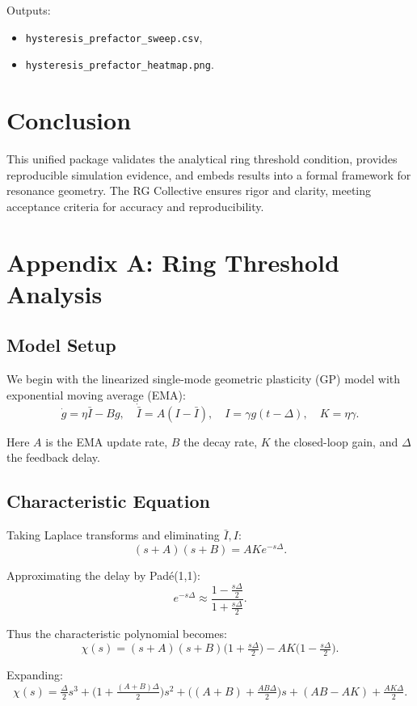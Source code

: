 \documentclass[12pt]{article}
\begin{document}
Outputs:
\begin{itemize}
  \item \texttt{hysteresis\_prefactor\_sweep.csv},
  \item \texttt{hysteresis\_prefactor\_heatmap.png}.
\end{itemize}

\section{Conclusion}

This unified package validates the analytical ring threshold condition,
provides reproducible simulation evidence, and embeds results into a formal
framework for resonance geometry. The RG Collective ensures rigor and
clarity, meeting acceptance criteria for accuracy and reproducibility.
\appendix
\section*{Appendix A: Ring Threshold Analysis}

\subsection*{Model Setup}

We begin with the linearized single-mode geometric plasticity (GP) model with exponential moving average (EMA):
\[
\dot g = \eta \bar I - B g, 
\quad \dot{\bar I} = A (I - \bar I), 
\quad I = \gamma g(t-\Delta), 
\quad K = \eta \gamma.
\]

Here $A$ is the EMA update rate, $B$ the decay rate, $K$ the closed-loop gain, and $\Delta$ the feedback delay.

\subsection*{Characteristic Equation}

Taking Laplace transforms and eliminating $\bar I, I$:
\[
(s+A)(s+B) = A K e^{-s\Delta}.
\]

Approximating the delay by Padé(1,1):
\[
e^{-s\Delta} \approx \frac{1 - \tfrac{s\Delta}{2}}{1 + \tfrac{s\Delta}{2}}.
\]

Thus the characteristic polynomial becomes:
\[
\chi(s) = (s+A)(s+B)\Big(1+\tfrac{s\Delta}{2}\Big) - A K\Big(1-\tfrac{s\Delta}{2}\Big).
\]

Expanding:
\[
\chi(s) = \tfrac{\Delta}{2}s^3 + \Big(1+\tfrac{(A+B)\Delta}{2}\Big) s^2 
+ \Big((A+B)+\tfrac{AB\Delta}{2}\Big) s + (AB - AK) + \tfrac{AK\Delta}{2}.
\]
\end{document}
